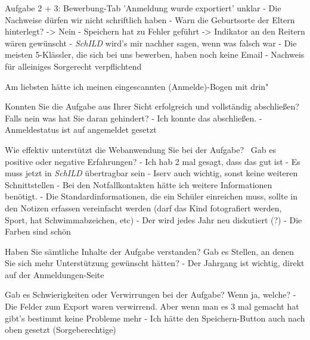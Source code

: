 Aufgabe 2 + 3:
Bewerbung-Tab 'Anmeldung wurde exportiert' unklar
- Die Nachweise dürfen wir nicht schriftlich haben
- Warn die Geburtsorte der Eltern hinterlegt? -> Nein
- Speichern hat zu Fehler geführt -> Indikator an den Reitern wären gewünscht
- \textit{SchILD} wird's mir nachher sagen, wenn was falsch war
- Die meisten 5-Klässler, die sich bei uns bewerben, haben noch keine Email
- Nachweis für alleiniges Sorgerecht verpflichtend

Am liebsten hätte ich meinen eingescannten (Anmelde)-Bogen mit drin"		



Konnten Sie die Aufgabe aus Ihrer Sicht erfolgreich und vollständig abschließen? Falls nein was hat Sie daran gehindert?
- Ich konnte das abschließen.		
- Anmeldestatus ist auf angemeldet gesetzt 	



















Wie effektiv unterstützt die Webanwendung Sie bei der Aufgabe?  Gab es positive oder negative Erfahrungen?	
- Ich hab 2 mal gesagt, dass das gut ist
- Es muss jetzt in \textit{SchILD} übertragbar sein
- Iserv auch wichtig, sonst keine weiteren Schnittstellen
- Bei den Notfallkontakten hätte ich weitere Informationen benötigt.
- Die Standardinformationen, die ein Schüler einreichen muss, sollte in den Notizen erfassen vereinfacht werden (darf das Kind fotografiert werden, Sport, hat Schwimmabzeichen, etc)
- Der wird jedes Jahr neu diskutiert (?)
- Die Farben sind schön			





Haben Sie sämtliche Inhalte der Aufgabe verstanden? Gab es Stellen, an denen Sie sich mehr Unterstützung gewünscht hätten?			
- Der Jahrgang ist wichtig, direkt auf der Anmeldungen-Seite	

Gab es Schwierigkeiten oder Verwirrungen bei der Aufgabe? Wenn ja, welche?	
- Die Felder zum Export waren verwirrend. Aber wenn man es 3 mal gemacht hat gibt's bestimmt keine Probleme mehr
- Ich hätte den Speichern-Button auch nach oben gesetzt (Sorgeberechtige)			











